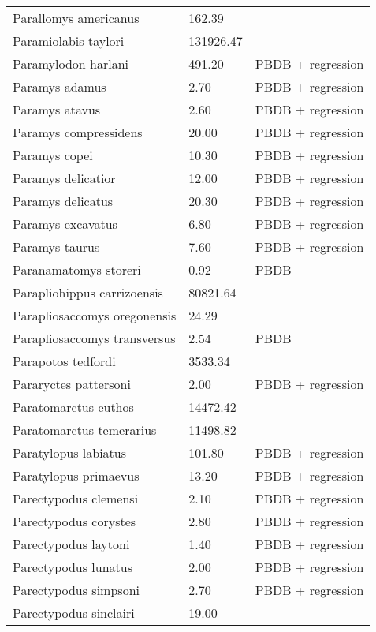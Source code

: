 \documentclass{article}
\begin{document}
\begin{center}
\begin{longtable}{p{} p{} p{}}
    Parallomys americanus & 162.39 & \cite{Tomiya2013} \\ 
    Paramiolabis taylori & 131926.47 & \cite{Tomiya2013} \\ 
    Paramylodon harlani & 491.20 & PBDB + regression \\ 
    Paramys adamus & 2.70 & PBDB + regression \\ 
    Paramys atavus & 2.60 & PBDB + regression \\ 
    Paramys compressidens & 20.00 & PBDB + regression \\ 
    Paramys copei & 10.30 & PBDB + regression \\ 
    Paramys delicatior & 12.00 & PBDB + regression \\ 
    Paramys delicatus & 20.30 & PBDB + regression \\ 
    Paramys excavatus & 6.80 & PBDB + regression \\ 
    Paramys taurus & 7.60 & PBDB + regression \\ 
    Paranamatomys storeri & 0.92 & PBDB \\ 
    Parapliohippus carrizoensis & 80821.64 & \cite{Tomiya2013} \\ 
    Parapliosaccomys oregonensis & 24.29 & \cite{Tomiya2013} \\ 
    Parapliosaccomys transversus & 2.54 & PBDB \\ 
    Parapotos tedfordi & 3533.34 & \cite{Tomiya2013} \\ 
    Pararyctes pattersoni & 2.00 & PBDB + regression \\ 
    Paratomarctus euthos & 14472.42 & \cite{Tomiya2013} \\ 
    Paratomarctus temerarius & 11498.82 & \cite{Tomiya2013} \\ 
    Paratylopus labiatus & 101.80 & PBDB + regression \\ 
    Paratylopus primaevus & 13.20 & PBDB + regression \\ 
    Parectypodus clemensi & 2.10 & PBDB + regression \\ 
    Parectypodus corystes & 2.80 & PBDB + regression \\ 
    Parectypodus laytoni & 1.40 & PBDB + regression \\ 
    Parectypodus lunatus & 2.00 & PBDB + regression \\ 
    Parectypodus simpsoni & 2.70 & PBDB + regression \\ 
    Parectypodus sinclairi & 19.00 & \cite{Wilson2012} \\ 

\end{longtable}
\end{center}
\end{document}
